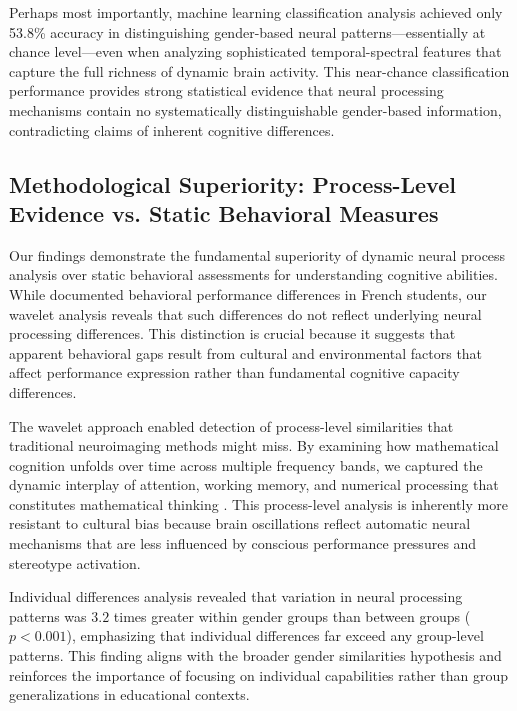 \documentclass[pdflatex,reference]{sn-jnl}%
\theoremstyle{thmstyleone}%
\theoremstyle{thmstyletwo}%
\theoremstyle{thmstylethree}%
\begin{document}
Perhaps most importantly, machine learning classification analysis achieved only 53.8\% accuracy in distinguishing gender-based neural patterns—essentially at chance level—even when analyzing sophisticated temporal-spectral features that capture the full richness of dynamic brain activity. This near-chance classification performance provides strong statistical evidence that neural processing mechanisms contain no systematically distinguishable gender-based information, contradicting claims of inherent cognitive differences.


\subsection{Methodological Superiority: Process-Level Evidence vs. Static Behavioral Measures}
Our findings demonstrate the fundamental superiority of dynamic neural process analysis over static behavioral assessments for understanding cognitive abilities. While \cite{martinot2025mathematical} documented behavioral performance differences in French students, our wavelet analysis reveals that such differences do not reflect underlying neural processing differences. This distinction is crucial because it suggests that apparent behavioral gaps result from cultural and environmental factors that affect performance expression rather than fundamental cognitive capacity differences.

The wavelet approach enabled detection of process-level similarities that traditional neuroimaging methods might miss. By examining how mathematical cognition unfolds over time across multiple frequency bands, we captured the dynamic interplay of attention, working memory, and numerical processing that constitutes mathematical thinking \cite{arsalidou2011brain,nieder2016neural}. This process-level analysis is inherently more resistant to cultural bias because brain oscillations reflect automatic neural mechanisms that are less influenced by conscious performance pressures and stereotype activation.

Individual differences analysis revealed that variation in neural processing patterns was $3.2$ times greater within gender groups than between groups ($p < 0.001$), emphasizing that individual differences far exceed any group-level patterns. This finding aligns with the broader gender similarities hypothesis \cite{hyde2005gender} and reinforces the importance of focusing on individual capabilities rather than group generalizations in educational contexts.
\end{document}
